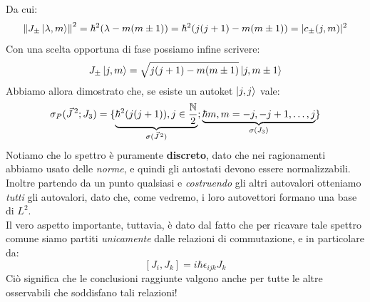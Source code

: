 \documentclass[../../FisicaTeorica.tex]{subfiles}
\begin{document}
Da cui:
\begin{align*}
\left\lVert J_\pm \ket{\lambda,m}\right\rVert^2=\hbar^2(\lambda-m(m\pm 1)) =\hbar^2(j(j+1)-m(m\pm 1)) = |c_{\pm}(j,m)|^2
\end{align*}
Con una scelta opportuna di fase possiamo infine scrivere:
\[
J_\pm \ket{j,m}=\sqrt{j(j+1)-m(m\pm 1)} \ket{j, m\pm 1}
\]
Abbiamo allora dimostrato che, se esiste un autoket $\ket{j,j}$  vale: 
\[
\sigma_P(\vec{J}^{\,2}; J_3) = \{\underbrace{ \hbar^2(j(j+1)), j\in \frac{\mathbb{N}}{2}}_{\sigma(\vec{J}^{\,2})}; \underbrace{\hbar m , m = -j, -j+1, \dots, j}_{\sigma(J_3)} \}
\]
Notiamo che lo spettro è puramente \textbf{discreto}, dato che nei ragionamenti abbiamo usato delle \textit{norme}, e quindi gli autostati devono essere normalizzabili. Inoltre partendo da un punto qualsiasi e \textit{costruendo} gli altri autovalori otteniamo \textit{tutti} gli autovalori, dato che, come vedremo, i loro autovettori formano una base di $L^2$.\\

Il vero aspetto importante, tuttavia, è dato dal fatto che per ricavare tale spettro comune siamo partiti \textit{unicamente} dalle relazioni di commutazione, e in particolare da:
\[
[J_i, J_k] = i\hbar \epsilon_{ijk} J_k
\]
Ciò significa che le conclusioni raggiunte valgono anche per tutte le altre osservabili che soddisfano tali relazioni! 
\end{document}
